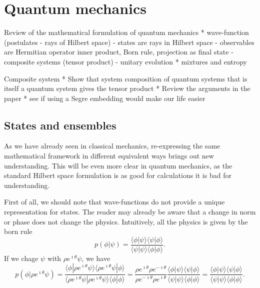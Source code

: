 

\def\>{\rangle}
\def\<{\langle}


\chapter{Quantum mechanics}


Review of the mathematical formulation of quantum mechanics
* wave-function (postulates - rays of Hilbert space)
- states are rays in Hilbert space
- observables are Hermitian operator inner product, Born rule, projection as final state
- composite systems (tensor product)
- unitary evolution
* mixtures and entropy

Composite system
* Show that system composition of quantum systems that is itself a quantum system gives the tensor product
* Review the arguments in the paper
* see if using a Segre embedding would make our life easier

\section{States and ensembles}

As we have already seen in classical mechanics, re-expressing the same mathematical framework in different equivalent ways brings out new understanding. This will be even more clear in quantum mechanics, as the standard Hilbert space formulation is as good for calculations it is bad for understanding.

First of all, we should note that wave-functions do not provide a unique representation for states. The reader may already be aware that a change in norm or phase does not change the physics. Intuitively, all the physics is given by the born rule
\begin{equation}
	p(\phi|\psi) = \frac{\< \phi | \psi \>\< \psi | \phi \>}{\< \psi | \psi \>\< \phi | \phi \>}.
\end{equation}
If we chage $\psi$ with $\rho e^{\imath \theta} \psi$, we have
\begin{equation}
	p(\phi|\rho e^{\imath \theta}\psi) = \frac{\< \phi |\rho e^{\imath \theta}\psi \>\<\rho e^{\imath \theta}\psi | \phi \>}{\< \rho e^{\imath \theta}\psi | \rho e^{\imath \theta}\psi \>\< \phi | \phi \>} = \frac{\rho e^{\imath \theta}\rho e^{-\imath \theta}}{\rho e^{-\imath \theta}\rho e^{\imath \theta}}\frac{\< \phi | \psi \>\< \psi | \phi \>}{\< \psi | \psi \>\< \phi | \phi \>}=\frac{\< \phi | \psi \>\< \psi | \phi \>}{\< \psi | \psi \>\< \phi | \phi \>}.
\end{equation}

